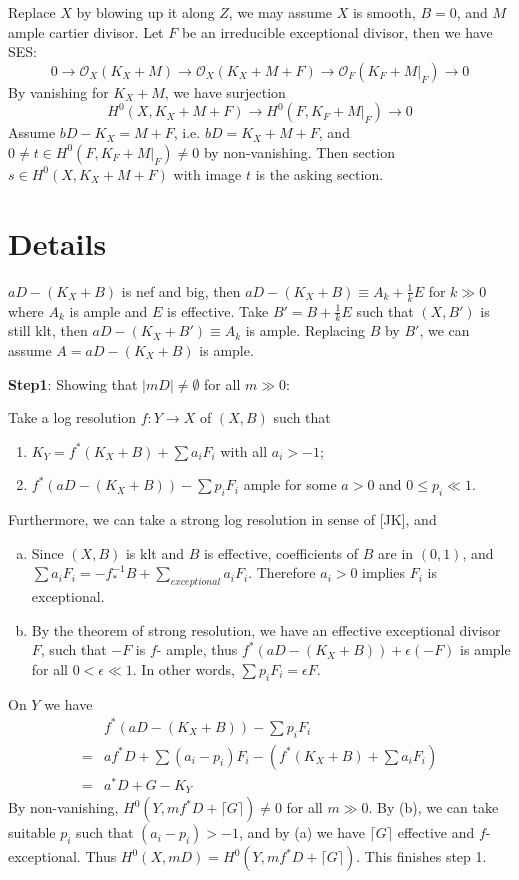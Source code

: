 \documentclass{article}
\begin{document}
Replace $ X $ by blowing up it along $ Z $, we may assume $ X $ is smooth, $ B=0 $, and $ M $ ample cartier divisor. Let $ F $ be an irreducible exceptional divisor, then we have SES:
$$ 0\to \mathcal{O}_X(K_X+M)\to \mathcal{O}_X(K_X+M+F)\to \mathcal{O}_F(K_F+M|_F)\to 0 $$
By vanishing for $ K_X+M $, we have surjection
$$ H^0(X,K_X+M+F)\to H^0(F,K_F+M|_F)\to 0 $$  
Assume $ bD-K_X=M+F $, i.e. $ bD=K_X+M+F $, and $ 0\neq t\in H^0(F,K_F+M|_F)\neq 0 $ by non-vanishing. Then section $ s\in H^0(X,K_X+M+F) $ with image $ t $ is the asking section.

\section{Details}
$ aD-(K_X+B) $ is nef and big, then $ aD-(K_X+B)\equiv A_k+\frac{1}{k}E $ for $ k\gg 0 $ where $ A_k $ is ample and $ E $ is effective. Take $ B'=B+\frac{1}{k}E $ such that $ (X,B') $ is still klt, then  $ aD-(K_X+B')\equiv A_k $ is ample. Replacing $ B $ by $ B' $,  we can assume $ A=aD-(K_X+B) $ is ample. 

\textbf{Step1}: Showing that $ |mD|\neq \emptyset $ for all $ m\gg 0 $:

Take a log resolution $ f:Y\to X $ of $ (X,B) $ such that
\begin{enumerate}
	\item $ K_Y=f^*(K_X+B)+\sum a_iF_i $ with all $ a_i>-1 $;
	\item $ f^*(aD-(K_X+B))-\sum p_iF_i $ ample for some $ a>0 $ and $ 0\leqslant p_i\ll 1 $.
\end{enumerate}

Furthermore, we can take a strong log resolution in sense of [JK], and 
\begin{enumerate}[(a)]
	\item Since $ (X,B) $ is klt and $ B $ is effective, coefficients of $ B $ are in $ (0,1) $, and $ \sum a_iF_i=-f^{-1}_*B+\sum_{exceptional}a_iF_i $. Therefore $ a_i>0 $ implies $ F_i $ is exceptional.
	\item By the theorem of strong resolution, we have an effective exceptional divisor $ F $, such that $ -F $ is $ f $- ample, thus $ f^*(aD-(K_X+B))+\epsilon(-F) $ is ample for all $ 0<\epsilon\ll 1 $. In other words, $ \sum p_iF_i=\epsilon F $.
\end{enumerate}

On $ Y $ we have
\begin{equation*}
	\begin{aligned}
	&f^*(aD-(K_X+B))-\sum p_iF_i\\
	=&af^*D+\sum(a_i-p_i)F_i-(f^*(K_X+B)+\sum a_iF_i)\\
	=&a^*D+G-K_Y
	\end{aligned}
\end{equation*}
By non-vanishing, $ H^0(Y,mf^*D+\lceil G\rceil )\neq 0 $ for all $ m\gg 0 $. By (b), we can take suitable $ p_i $ such that $ (a_i-p_i)>-1 $, and by (a) we have $ \lceil G\rceil  $ effective and $ f $-exceptional. Thus  $ H^0(X,mD)= H^0(Y,mf^*D+\lceil G\rceil ) $. This  finishes step 1.
\end{document}
